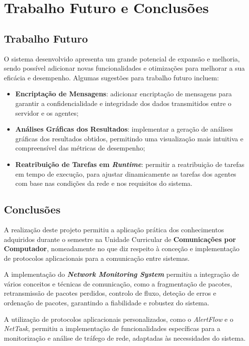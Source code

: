 \documentclass[a4paper,12pt]{scrreprt}
\begin{document}
\chapter{Trabalho Futuro e Conclusões}

\section{Trabalho Futuro}

O sistema desenvolvido apresenta um grande potencial de expansão e melhoria, sendo
possível adicionar novas funcionalidades e otimizações para melhorar a sua eficácia
e desempenho. Algumas sugestões para trabalho futuro incluem:

\begin{itemize}
    \item \textbf{Encriptação de Mensagens}: adicionar encriptação de mensagens para
    garantir a confidencialidade e integridade dos dados transmitidos entre o servidor
    e os agentes;
    \item \textbf{Análises Gráficas dos Resultados}: implementar a geração de análises
    gráficas dos resultados obtidos, permitindo uma visualização mais intuitiva e
    compreensível das métricas de desempenho;
    \item \textbf{Reatribuição de Tarefas em \textit{Runtime}}: permitir a reatribuição
    de tarefas em tempo de execução, para ajustar dinamicamente as tarefas dos agentes
    com base nas condições da rede e nos requisitos do sistema.
\end{itemize}

\section{Conclusões}

A realização deste projeto permitiu a aplicação prática dos conhecimentos adquiridos
durante o semestre na Unidade Curricular de \textbf{Comunicações por Computador},
nomeadamente no que diz respeito à conceção e implementação de protocolos aplicacionais
para a comunicação entre sistemas. 

A implementação do \textbf{\textit{Network Monitoring System}} permitiu a integração de
vários conceitos e técnicas de comunicação, como a fragmentação de pacotes, retransmissão
de pacotes perdidos, controlo de fluxo, deteção de erros e ordenação de pacotes, garantindo
a fiabilidade e robustez do sistema.

A utilização de protocolos aplicacionais personalizados, como o \textit{AlertFlow} e o
\textit{NetTask}, permitiu a implementação de funcionalidades específicas para a
monitorização e análise de tráfego de rede, adaptadas às necessidades do sistema.
\end{document}
